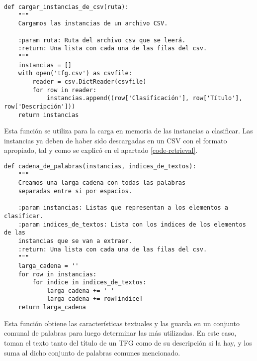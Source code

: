 \lhead{\emph{\ChapterTwo{}}}
\lstset{
   language=Python
}

\begin{center}
\begin{minipage}{\linewidth}
\begin{lstlisting}[caption=Función para cargar instancias de un archivo CSV.]
def cargar_instancias_de_csv(ruta):
    """
    Cargamos las instancias de un archivo CSV.

    :param ruta: Ruta del archivo csv que se leerá.
    :return: Una lista con cada una de las filas del csv.
    """
    instancias = []
    with open('tfg.csv') as csvfile:
        reader = csv.DictReader(csvfile)
        for row in reader:
            instancias.append((row['Clasificación'], row['Título'], row['Descripción']))
    return instancias
\end{lstlisting}
\end{minipage}
\end{center}

Esta función se utiliza para la carga en memoria de las instancias a clasificar.%
%
Las instancias ya deben de haber sido descargadas en un CSV con el formato apropiado, tal y como se explicó en el apartado \ref{code-retrieval}.

\begin{center}
\begin{minipage}{\linewidth}
\begin{lstlisting}[caption=Función que recopila un conjunto de palabras comunes]
def cadena_de_palabras(instancias, indices_de_textos):
    """
    Creamos una larga cadena con todas las palabras
    separadas entre si por espacios.

    :param instancias: Listas que representan a los elementos a clasificar.
    :param indices_de_textos: Lista con los indices de los elementos de las
    instancias que se van a extraer.
    :return: Una lista con cada una de las filas del csv.
    """
    larga_cadena = ''
    for row in instancias:
        for indice in indices_de_textos:
            larga_cadena += ' '
            larga_cadena += row[indice]
    return larga_cadena
\end{lstlisting}
\end{minipage}
\end{center}

Esta función obtiene las características textuales y las guarda en un conjunto comunal de palabras para luego determinar las más utilizadas.
%
En este caso, toman el texto tanto del título de un TFG como de su descripción si la hay, y los suma al dicho conjunto de palabras comunes mencionado.

